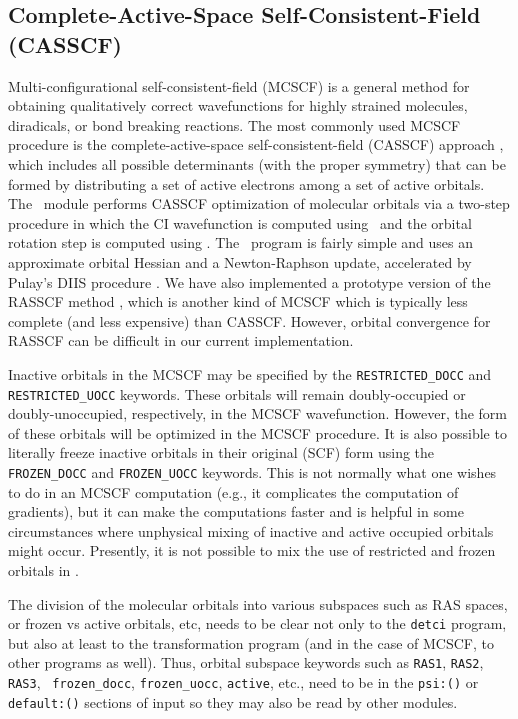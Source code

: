 \subsection{Complete-Active-Space Self-Consistent-Field (CASSCF)} \label{casscf}
                                                                                
Multi-configurational self-consistent-field (MCSCF) 
is a general method for obtaining qualitatively correct
wavefunctions for highly strained molecules, diradicals, or bond
breaking reactions.  The most commonly used MCSCF procedure
is the complete-active-space self-consistent-field (CASSCF)
approach \cite{Roos:1980}, which includes all possible determinants
(with the proper symmetry) that can be formed by distributing 
a set of active electrons among a set of active orbitals.
The \PSIdetcasman\ module performs
CASSCF optimization of molecular orbitals via a two-step
procedure in which the CI wavefunction is computed using
\PSIdetci\, and the orbital rotation step is computed using
\PSIdetcas.  The \PSIdetcas\ program is fairly simple
and uses an approximate orbital Hessian \cite{Chaban:1997:88} 
and a Newton-Raphson update,
accelerated by Pulay's DIIS procedure \cite{Pulay:1980}.  
We have also implemented a prototype version of the RASSCF method
\cite{Malmqvist:1990:RASSCF}, which is another kind of MCSCF which 
is typically less complete (and less expensive) than CASSCF.
However, orbital convergence for RASSCF can be difficult in our
current implementation.

Inactive orbitals in the MCSCF may be specified by the 
{\tt RESTRICTED\_DOCC} and {\tt RESTRICTED\_UOCC} keywords.  These
orbitals will remain doubly-occupied or doubly-unoccupied, respectively,
in the MCSCF wavefunction.  However, the form of these orbitals will
be optimized in the MCSCF procedure.  It is also possible to 
literally freeze inactive orbitals in their original (SCF) form
using the {\tt FROZEN\_DOCC} and {\tt FROZEN\_UOCC} keywords.
This is not normally what one wishes to do in an MCSCF computation
(e.g., it complicates the computation of gradients),
but it can make the computations faster and is helpful in some
circumstances where unphysical mixing of inactive and active
occupied orbitals might occur.  Presently, it is not possible
to mix the use of restricted and frozen orbitals in \PSIthree.

The division of the molecular orbitals into various subspaces such as RAS
spaces, or frozen vs active orbitals, etc, needs to be clear not only to
the {\tt detci} program, but also at least to the transformation program
(and in the case of MCSCF, to other programs as well).  Thus,
orbital subspace keywords such as {\tt RAS1}, {\tt RAS2}, {\tt RAS3}, {\tt
frozen\_docc}, {\tt frozen\_uocc}, {\tt active}, etc., need to be
in the {\tt psi:()} or {\tt default:()} sections of input so they may
also be read by other modules.

